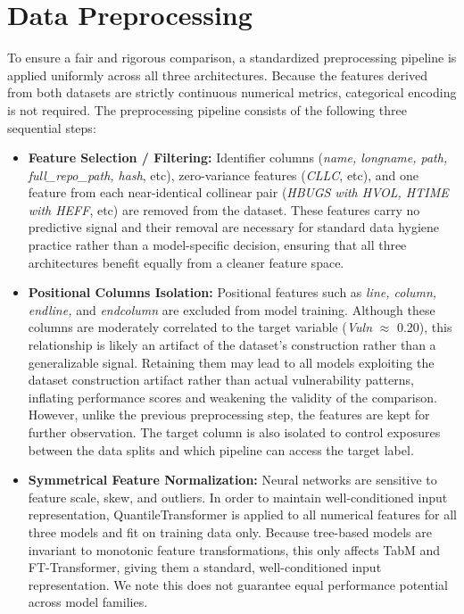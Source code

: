 \section{Data Preprocessing}

To ensure a fair and rigorous comparison, a standardized preprocessing pipeline is applied uniformly across all three architectures. Because the features derived from both datasets are strictly continuous numerical metrics, categorical encoding is not required. The preprocessing pipeline consists of the following three sequential steps:

\begin{itemize}
  \item \textbf{Feature Selection / Filtering:} Identifier columns (\emph{name, longname, path, full\_repo\_path, hash}, etc), zero-variance features (\emph{CLLC}, etc), and one feature from each near-identical collinear pair (\emph{HBUGS with HVOL, HTIME with HEFF}, etc) are removed from the dataset. These features carry no predictive signal and their removal are necessary for standard data hygiene practice rather than a model-specific decision, ensuring that all three architectures benefit equally from a cleaner feature space.
  \item \textbf{Positional Columns Isolation:} Positional features such as \emph{line, column, endline,} and \emph{endcolumn} are excluded from model training. Although these columns are moderately correlated to the target variable (\emph{Vuln} $\approx$ 0.20), this relationship is likely an artifact of the dataset's construction rather than a generalizable signal. Retaining them may lead to all models exploiting the dataset construction artifact rather than actual vulnerability patterns, inflating performance scores and weakening the validity of the comparison.  However, unlike the previous preprocessing step, the features are kept for further observation. The target column is also isolated to control exposures between the data splits and which pipeline can access the target label.
  \item \textbf{Symmetrical Feature Normalization:} Neural networks are sensitive to feature scale, skew, and outliers. In order to maintain well-conditioned input representation, QuantileTransformer is applied to all numerical features for all three models and fit on training data only. Because tree-based models are invariant to monotonic feature transformations, this only affects TabM and FT-Transformer, giving them a standard, well-conditioned input representation. We note this does not guarantee equal performance potential across model families.

\end{itemize}

